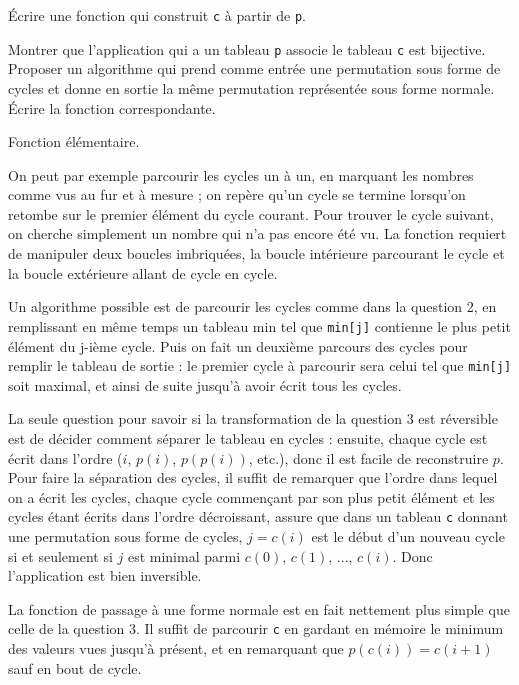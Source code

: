 Écrire une fonction qui construit \texttt{c} à partir de \texttt{p}.

\Q
Montrer que l'application qui a un tableau \texttt{p} associe le tableau \texttt{c} est bijective. Proposer un algorithme qui prend comme entrée une permutation sous forme de cycles et donne en sortie la même permutation représentée sous forme normale. Écrire la fonction correspondante.

\Corrige

\Q
Fonction élémentaire.



\Q
On peut par exemple parcourir les cycles un à un, en marquant les nombres comme \og vus \fg{} au fur et à mesure ; on repère qu'un cycle se termine lorsqu'on retombe sur le premier élément du cycle courant. Pour trouver le cycle suivant, on cherche simplement un nombre qui n'a pas encore été vu. La fonction requiert de manipuler deux boucles imbriquées, la boucle intérieure parcourant le cycle et la boucle extérieure allant de cycle en cycle.



\Q
Un algorithme possible est de parcourir les cycles comme dans la question 2, en remplissant en même temps un tableau \og min \fg{} tel que \texttt{min[j]} contienne le plus petit élément du j-ième cycle. Puis on fait un deuxième parcours des cycles pour remplir le tableau de sortie : le premier cycle à parcourir sera celui tel que \texttt{min[j]} soit maximal, et ainsi de suite jusqu'à avoir écrit tous les cycles.



\Q
La seule question pour savoir si la transformation de la question 3 est réversible est de décider comment séparer le tableau en cycles : ensuite, chaque cycle est écrit dans l'ordre ($i$, $p(i)$, $p(p(i))$, etc.), donc il est facile de reconstruire $p$. Pour faire la séparation des cycles, il suffit de remarquer que l'ordre dans lequel on a écrit les cycles, chaque cycle commençant par son plus petit élément et les cycles étant écrits dans l'ordre décroissant, assure que dans un tableau \texttt{c} donnant une permutation sous forme de cycles, $j=c(i)$ est le début d'un nouveau cycle si et seulement si $j$ est minimal parmi $c(0)$, $c(1)$, ..., $c(i)$. Donc l'application est bien inversible.
\medskip

La fonction de passage à une forme normale est en fait nettement plus simple que celle de la question 3. Il suffit de parcourir \texttt{c} en gardant en mémoire le minimum des valeurs vues jusqu'à présent, et en remarquant que $p(c(i))=c(i+1)$ sauf en bout de cycle.



\Fin
